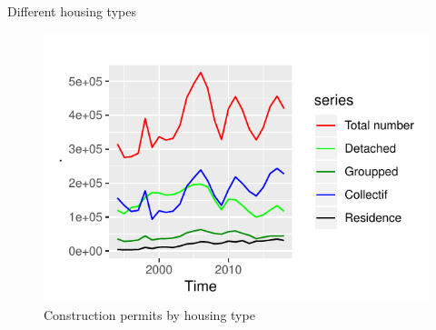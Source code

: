\documentclass[11pt,ignorenonframetext,]{beamer}
\begin{document}
\begin{frame}{Different housing types}
\protect\hypertarget{different-housing-types}{}

\FloatBarrier

\tiny

\begin{figure}[!htbp]

{\centering \includegraphics{presentation_files/figure-beamer/unnamed-chunk-16-1} 

}

\caption{Construction permits by housing type}\label{fig:unnamed-chunk-16}
\end{figure}

\normalsize

\FloatBarrier

\end{frame}
\end{document}
